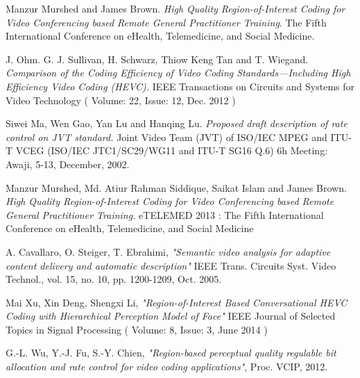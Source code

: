 \documentclass[11pt]{article} %
\begin{document}
\begin{thebibliography}{9}
Manzur Murshed and James Brown. 
\textit{High Quality Region-of-Interest Coding for Video Conferencing based Remote General Practitioner Training}. 
The Fifth International Conference on eHealth, Telemedicine, and Social Medicine.

J. Ohm. G. J. Sullivan, H. Schwarz, Thiow Keng Tan and T. Wiegand.
\textit{Comparison of the Coding Efficiency of Video Coding Standards—Including High Efficiency Video Coding (HEVC).}
 IEEE Transactions on Circuits and Systems for Video Technology ( Volume: 22, Issue: 12, Dec. 2012 )

Siwei Ma, Wen Gao, Yan Lu and Hanqing Lu.
\textit{Proposed draft description of rate control on JVT standard. }
Joint Video Team (JVT) of ISO/IEC MPEG and ITU-T VCEG (ISO/IEC JTC1/SC29/WG11 and ITU-T SG16 Q.6) 6h Meeting: Awaji, 5-13, December, 2002.

Manzur Murshed, Md. Atiur Rahman Siddique, Saikat Islam and James Brown.
\textit{High Quality Region-of-Interest Coding for Video Conferencing based Remote General Practitioner Training.}
eTELEMED 2013 : The Fifth International Conference on eHealth, Telemedicine, and Social Medicine

A. Cavallaro, O. Steiger, T. Ebrahimi, \textit{"Semantic video analysis for adaptive content delivery and automatic description"}
IEEE Trans. Circuits Syst. Video Technol., vol. 15, no. 10, pp. 1200-1209, Oct. 2005.

Mai Xu, Xin Deng, Shengxi Li, \textit{"Region-of-Interest Based Conversational HEVC Coding with Hierarchical Perception Model of Face"}
IEEE Journal of Selected Topics in Signal Processing ( Volume: 8, Issue: 3, June 2014 )

G.-L. Wu, Y.-J. Fu, S.-Y. Chien, \textit{"Region-based perceptual quality regulable bit allocation and rate control for video coding applications"},
Proc. VCIP, 2012.

\end{thebibliography}
\end{document}
